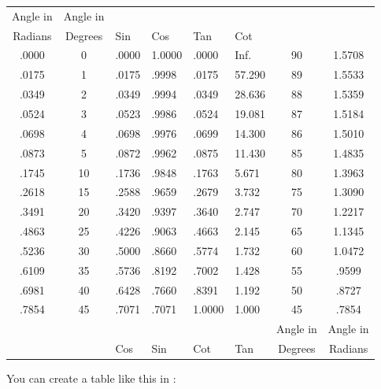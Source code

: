 \begin{center}
\begin{tabular}{ccllllcc}
Angle in & Angle in &        &        &        &        &          &          \\
Radians  & Degrees  &  Sin   &  Cos   & Tan    & Cot    &          &          \\  \hline
.0000    &	0       & .0000  & 1.0000 & .0000  & Inf.   & 90       & 1.5708   \\
.0175    &	1       & .0175  & .9998  & .0175  & 57.290 & 89       & 1.5533   \\
.0349    &	2       & .0349  & .9994  & .0349  & 28.636 & 88       & 1.5359   \\
.0524    &	3       & .0523  & .9986  & .0524  & 19.081 & 87       & 1.5184   \\
.0698    &	4       & .0698  & .9976  & .0699  & 14.300 & 86       & 1.5010   \\
.0873    &	5       & .0872  & .9962  & .0875  & 11.430 & 85       & 1.4835   \\
.1745    &	10      & .1736  & .9848  & .1763  & 5.671  & 80       & 1.3963   \\
.2618    &	15      & .2588  & .9659  & .2679  & 3.732  & 75       & 1.3090   \\
.3491    &	20      & .3420  & .9397  & .3640  & 2.747  & 70       & 1.2217   \\
.4863    &	25      & .4226  & .9063  & .4663  & 2.145  & 65       & 1.1345   \\
.5236    &	30      & .5000  & .8660  & .5774  & 1.732  & 60       & 1.0472   \\
.6109    &	35      & .5736  & .8192  & .7002  & 1.428  & 55       & .9599    \\
.6981    &	40      & .6428  & .7660  & .8391  & 1.192  & 50       &	.8727   \\
.7854    &	45      & .7071  & .7071  & 1.0000 & 1.000  & 45       & .7854    \\  \hline
         &          &        &        &        &        & Angle in & Angle in \\
         &          &  Cos   &  Sin   & Cot    & Tan    & Degrees  & Radians  \\  
\end{tabular}
\end{center}

You can create a table like this in \sage :

